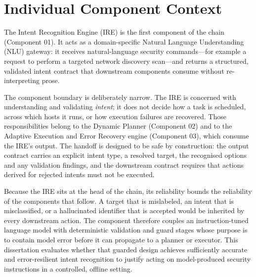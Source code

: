 \section{Individual Component Context}\label{sec:individual-component-context}

The Intent Recognition Engine (IRE) is the first component of the chain
(Component 01). It acts as a domain-specific Natural Language Understanding (NLU)
gateway: it receives natural-language security commands---for example a request
to perform a targeted network discovery scan---and returns a structured,
validated intent contract that downstream components consume without
re-interpreting prose.

The component boundary is deliberately narrow. The IRE is concerned with
understanding and validating \emph{intent}; it does not decide how a task is
scheduled, across which hosts it runs, or how execution failures are recovered.
Those responsibilities belong to the Dynamic Planner (Component 02) and to the
Adaptive Execution and Error Recovery engine (Component 03), which consume the
IRE's output. The handoff is designed to be safe by construction: the output
contract carries an explicit intent type, a resolved target, the recognised
options and any validation findings, and the downstream contract requires that
actions derived for rejected intents must not be executed.

Because the IRE sits at the head of the chain, its reliability bounds the
reliability of the components that follow. A target that is mislabeled, an
intent that is misclassified, or a hallucinated identifier that is accepted would
be inherited by every downstream action. The component therefore couples an
instruction-tuned language model with deterministic validation and guard stages
whose purpose is to contain model error before it can propagate to a planner or
executor. This dissertation evaluates whether that guarded design achieves
sufficiently accurate and error-resilient intent recognition to justify acting on
model-produced security instructions in a controlled, offline setting.